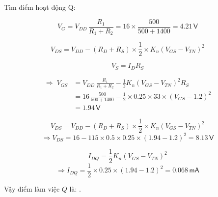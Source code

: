 \noindent Tìm điểm hoạt động Q:

%
%

\[
V_{G}=V_{DD}\,\frac{R_{1}}{R_{1}+R_{2}}=16\times\frac{500}{500+1400}=4.21\,\textsf{V}
\]

\[
V_{DS}=V_{DD}-\left(R_{D}+R_{S}\right)\times\frac{1}{2}\times K_{n}\left(V_{GS}-V_{TN}\right)^{2}
\]

\[
V_{S}=I_{D}R_{S}
\]

\[
\begin{aligned}
	\Rightarrow\; V_{GS} &= V_{DD}\,\frac{R_{1}}{R_{1}+R_{2}}
	- \frac{1}{2}K_{n}(V_{GS}-V_{TN})^{2}R_{S} \\[6pt]
	&= 16\,\frac{500}{500+1400}
	- \frac{1}{2}\times0.25\times33\times(V_{GS}-1.2)^{2} \\[6pt]
	&= 1.94\,\textsf{V}
\end{aligned}
\]

\[
V_{DS}=V_{DD}-\left(R_{D}+R_{S}\right)\times\frac{1}{2}\times K_{n}\left(V_{GS}-V_{TN}\right)^{2}
\]
\[
\Rightarrow V_{DS}=16-115\times0.5\times0.25\times(1.94-1.2)^{2}=8.13\,\textsf{V}
\]

\[
I_{DQ}=\frac{1}{2}K_{n}\left(V_{GS}-V_{TN}\right)^{2}
\]
\[
\Rightarrow I_{DQ}=\frac{1}{2}\times0.25\times(1.94-1.2)^{2}=0.068\,\textsf{mA}
\]

Vậy điểm làm việc $Q$ là: .


